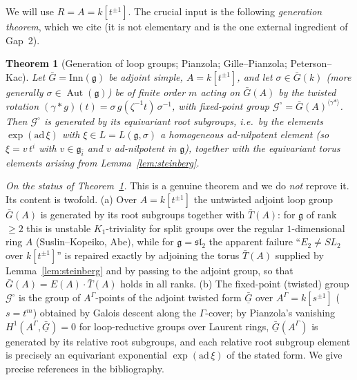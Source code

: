 \documentclass{amsart}
\newtheorem{theorem}{Theorem}
\theoremstyle{definition}
\DeclareMathOperator{\Aut}{Aut}
\newcommand{\g}{\mathfrak{g}}
\begin{document}
We will use $R=A=k[t^{\pm1}]$.  The crucial input is the following
\emph{generation theorem}, which we cite (it is not elementary and is the one
external ingredient of Gap~2).

\begin{theorem}[Generation of loop groups; {Pianzola; Gille--Pianzola; Peterson--Kac}]
\label{thm:looptorgen}
Let $\bar G=\mathrm{Inn}(\g)$ be adjoint simple, $A=k[t^{\pm1}]$, and let
$\sigma\in\bar G(k)$ (more generally $\sigma\in\Aut(\g)$) be of finite order
$m$ acting on $\bar G(A)$ by the twisted rotation
$(\gamma * g)(t)=\sigma\,g(\zeta^{-1}t)\,\sigma^{-1}$, with fixed-point group
$\mathcal G^\circ=\bar G(A)^{\langle\gamma*\rangle}$.  Then $\mathcal
G^\circ$ is generated by its equivariant root subgroups, i.e.\ by the
elements $\exp(\mathrm{ad}\,\xi)$ with $\xi\in L=L(\g,\sigma)$ a homogeneous
\textnormal{ad}-nilpotent element (so $\xi=v\,t^i$ with $v\in\g_{\bar i}$ and
$v$ \textnormal{ad}-nilpotent in $\g$), together with the equivariant torus
elements arising from \textnormal{Lemma~\ref{lem:steinberg}}.
\end{theorem}

\noindent\emph{On the status of Theorem~\ref{thm:looptorgen}.}  This is a
genuine theorem and we do \emph{not} reprove it.  Its content is twofold.
(a) Over $A=k[t^{\pm1}]$ the untwisted adjoint loop group $\bar G(A)$ is
generated by its root subgroups together with $\bar T(A)$: for $\g$ of rank
$\ge2$ this is unstable $K_1$-triviality for split groups over the regular
$1$-dimensional ring $A$ (Suslin--Kopeiko, Abe), while for $\g=\mathfrak{sl}_2$
the apparent failure ``$E_2\ne SL_2$ over $k[t^{\pm1}]$'' is repaired exactly
by adjoining the torus $\bar T(A)$ supplied by Lemma~\ref{lem:steinberg} and
by passing to the adjoint group, so that $\bar G(A)=E(A)\cdot\bar T(A)$ holds
in all ranks.  (b) The fixed-point (twisted) group $\mathcal G^\circ$ is the
group of $A^\Gamma$-points of the adjoint twisted form $\underline{\bar G}$
over $A^\Gamma=k[s^{\pm1}]$ ($s=t^m$) obtained by Galois descent along the
$\Gamma$-cover; by Pianzola's vanishing $H^1(A^\Gamma,\underline{\bar G})=0$
for loop-reductive groups over Laurent rings, $\underline{\bar G}(A^\Gamma)$
is generated by its relative root subgroups, and each relative root subgroup
element is precisely an equivariant exponential $\exp(\mathrm{ad}\,\xi)$ of
the stated form.  We give precise references in the bibliography.
\end{document}
